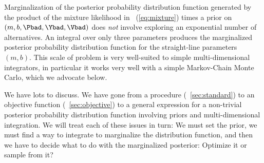 \documentclass[12pt,twoside,pdftex]{article}
\begin{document}
Marginalization of the posterior probability distribution function
generated by the product of the mixture likelihood in
\equationname~(\ref{eq:mixture}) times a prior on
$(m,b,\Pbad,\Ybad,\Vbad)$ does \emph{not} involve exploring an
exponential number of alternatives.  An integral over only three
parameters produces the marginalized posterior probability
distribution function for the straight-line parameters $(m,b)$.  This
scale of problem is very well-suited to simple multi-dimensional
integrators, in particular it works very well with a simple
Markov-Chain Monte Carlo, which we advocate below.

We have lots to discuss.  We have gone from a procedure
(\sectionname~\ref{sec:standard}) to an objective function
(\sectionname~\ref{sec:objective}) to a general expression for a
non-trivial posterior probability distribution function involving
priors and multi-dimensional integration.  We will treat each of
these issues in turn: We must set the prior, we must find a way to
integrate to marginalize the distribution function, and then we have
to decide what to do with the marginalized posterior: Optimize it or
sample from it?
\end{document}
